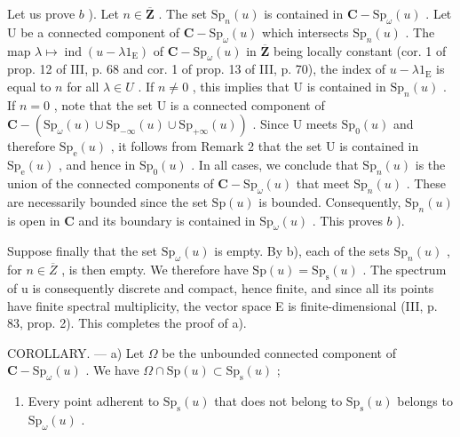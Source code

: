 Let us prove \(b\) ). Let \(n \in \overline{\mathbf{Z}}\) . The set \(\mathrm{Sp}_n(u)\) is contained in \(\mathbf{C} - \mathrm{Sp}_{\omega}(u)\) . Let U be a connected component of \(\mathbf{C} - \mathrm{Sp}_{\omega}(u)\) which intersects \(\mathrm{Sp}_n(u)\) . The map \(\lambda \mapsto \operatorname{ind}(u - \lambda 1_{\mathrm{E}})\) of \(\mathbf{C} - \mathrm{Sp}_{\omega}(u)\) in \(\overline{\mathbf{Z}}\) being locally constant (cor. 1 of prop. 12 of III, p. 68 and cor. 1 of prop. 13 of III, p. 70), the index of \(u - \lambda 1_{\mathrm{E}}\) is equal to \(n\) for all \(\lambda \in U\) . If \(n \neq 0\) , this implies that U is contained in \(\mathrm{Sp}_n(u)\) . If \(n = 0\) , note that the set U is a connected component of \(\mathbf{C} - (\mathrm{Sp}_{\omega}(u) \cup \mathrm{Sp}_{-\infty}(u) \cup \mathrm{Sp}_{+\infty}(u))\) . Since U meets \(\mathrm{Sp}_0(u)\) and therefore \(\mathrm{Sp}_{\mathrm{e}}(u)\) , it follows from Remark 2 that the set U is contained in \(\mathrm{Sp}_{\mathrm{e}}(u)\) , and hence in \(\mathrm{Sp}_0(u)\) . In all cases, we conclude that \(\mathrm{Sp}_n(u)\) is the union of the connected components of \(\mathbf{C} - \mathrm{Sp}_{\omega}(u)\) that meet \(\mathrm{Sp}_n(u)\) . These are necessarily bounded since the set \(\mathrm{Sp}(u)\) is bounded. Consequently, \(\mathrm{Sp}_n(u)\) is open in \(\mathbf{C}\) and its boundary is contained in \(\mathrm{Sp}_{\omega}(u)\) . This proves \(b\) ).

Suppose finally that the set \(\mathrm{Sp}_{\omega}(u)\) is empty. By b), each of the sets \(\mathrm{Sp}_{n}(u)\) , for \(n \in \overline{Z}\) , is then empty. We therefore have \(\mathrm{Sp}(u) = \mathrm{Sp}_{\mathrm{s}}(u)\) . The spectrum of u is consequently discrete and compact, hence finite, and since all its points have finite spectral multiplicity, the vector space E is finite-dimensional (III, p. 83, prop. 2). This completes the proof of a).

COROLLARY. --- a) Let \(\Omega\) be the unbounded connected component of \(\mathbf{C} - \mathrm{Sp}_{\omega}(u)\) . We have \(\Omega \cap \mathrm{Sp}(u) \subset \mathrm{Sp}_{\mathrm{s}}(u)\) ;

\begin{enumerate}
\def\labelenumi{\alph{enumi})}
\setcounter{enumi}{1}
\tightlist
\item
  Every point adherent to \(\mathrm{Sp}_{\mathrm{s}}(u)\) that does not belong to \(\mathrm{Sp}_{\mathrm{s}}(u)\) belongs to \(\mathrm{Sp}_{\omega}(u)\) .
\end{enumerate}

